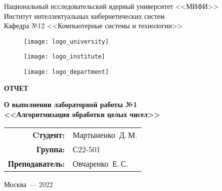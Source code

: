 \begin{titlepage}
  \begin{center}
    \begin{large}
      Национальный исследовательский ядерный университет <<МИФИ>> \\
      \vspace{0.25cm}
      Институт интеллектуальных кибернетических систем \\
      \vspace{0.25cm}
      Кафедра №12 <<Компьютерные системы и технологии>>
    \end{large}

    \vspace*{1cm}

    \begin{figure}[H]
      \centering
      \begin{minipage}[c]{0.3\textwidth}
        \texttt{[image: logo\_university]}
      \end{minipage}
      \hfill
      \begin{minipage}[c]{0.3\textwidth}
        \texttt{[image: logo\_institute]}
      \end{minipage}
      \hfill
      \begin{minipage}[c]{0.3\textwidth}
        \texttt{[image: logo\_department]}
      \end{minipage}
    \end{figure}

    \vspace{4cm}

    \begin{huge}
      \textbf{ОТЧЕТ}
    \end{huge}

    \begin{large}
      \textbf{О выполнении лабораторной работы №1 \\
        <<Алгоритмизация обработки целых чисел>>}
    \end{large}
    
    \vfill
    
    \begin{flushright}
      \begin{tabular}{ r l }
        \textbf{Cтудент:} & Мартыненко~Д.\,М. \\ 
        \textbf{Группа:} & С22-501 \\  
        \textbf{Преподаватель:} & Овчаренко~Е.\,С. \\
      \end{tabular}
    \end{flushright}
            
    Москва~--- 2022
  \end{center}
\end{titlepage}
